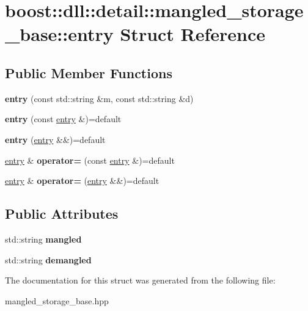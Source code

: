 \hypertarget{a00097}{}\section{boost\+:\+:dll\+:\+:detail\+:\+:mangled\+\_\+storage\+\_\+base\+:\+:entry Struct Reference}
\label{a00097}
\subsection*{Public Member Functions}
\begin{DoxyCompactItemize}
\item 
{\bfseries entry} (const std\+::string \&m, const std\+::string \&d)\hypertarget{a00097_aa25c89fd07d608756ab413b9899af332}{}\label{a00097_aa25c89fd07d608756ab413b9899af332}

\item 
{\bfseries entry} (const \hyperlink{a00097}{entry} \&)=default\hypertarget{a00097_aeeacd3b3b5541903802e9cde71f2125e}{}\label{a00097_aeeacd3b3b5541903802e9cde71f2125e}

\item 
{\bfseries entry} (\hyperlink{a00097}{entry} \&\&)=default\hypertarget{a00097_abd8831ea9bb6fa1f14672b988eca66f5}{}\label{a00097_abd8831ea9bb6fa1f14672b988eca66f5}

\item 
\hyperlink{a00097}{entry} \& {\bfseries operator=} (const \hyperlink{a00097}{entry} \&)=default\hypertarget{a00097_a3f3f71d35d817282b3a7be1a834ea196}{}\label{a00097_a3f3f71d35d817282b3a7be1a834ea196}

\item 
\hyperlink{a00097}{entry} \& {\bfseries operator=} (\hyperlink{a00097}{entry} \&\&)=default\hypertarget{a00097_acd12159970ef77556cca244fbbaf3366}{}\label{a00097_acd12159970ef77556cca244fbbaf3366}

\end{DoxyCompactItemize}
\subsection*{Public Attributes}
\begin{DoxyCompactItemize}
\item 
std\+::string {\bfseries mangled}\hypertarget{a00097_aaf727476edc89f98715451a57df11313}{}\label{a00097_aaf727476edc89f98715451a57df11313}

\item 
std\+::string {\bfseries demangled}\hypertarget{a00097_ae15d9b4dcd34a307d2064d5a2a67f58c}{}\label{a00097_ae15d9b4dcd34a307d2064d5a2a67f58c}

\end{DoxyCompactItemize}


The documentation for this struct was generated from the following file\+:\begin{DoxyCompactItemize}
\item 
mangled\+\_\+storage\+\_\+base.\+hpp\end{DoxyCompactItemize}
